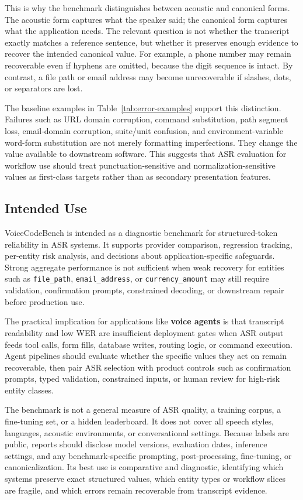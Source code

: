 \documentclass[10pt,twocolumn]{article}
\begin{document}
This is why the benchmark distinguishes between acoustic and canonical
forms. The acoustic form captures what the speaker said; the canonical
form captures what the application needs. The relevant question is not
whether the transcript exactly matches a reference sentence, but whether
it preserves enough evidence to recover the intended canonical value.
For example, a phone number may remain recoverable even if hyphens are
omitted, because the digit sequence is intact. By contrast, a file path
or email address may become unrecoverable if slashes, dots, or
separators are lost.

The baseline examples in Table~\ref{tab:error-examples} support this
distinction. Failures such as URL domain corruption, command
substitution, path segment loss, email-domain corruption, suite/unit
confusion, and environment-variable word-form substitution are not
merely formatting imperfections. They change the value available to
downstream software. This suggests that ASR evaluation for workflow use
should treat punctuation-sensitive and normalization-sensitive values as
first-class targets rather than as secondary presentation features.

\subsection{Intended Use}\label{intended-use}

VoiceCodeBench is intended as a diagnostic benchmark for
structured-token reliability in ASR systems. It supports provider
comparison, regression tracking, per-entity risk analysis, and decisions
about application-specific safeguards. Strong aggregate performance is
not sufficient when weak recovery for entities such as
\texttt{file\_path}, \texttt{email\_address}, or
\texttt{currency\_amount} may still require validation, confirmation
prompts, constrained decoding, or downstream repair before production
use.

The practical implication for applications like \textbf{voice agents} is that
transcript readability and low WER are insufficient deployment gates
when ASR output feeds tool calls, form fills, database writes, routing
logic, or command execution. Agent pipelines should evaluate whether the
specific values they act on remain recoverable, then pair ASR selection
with product controls such as confirmation prompts, typed validation,
constrained inputs, or human review for high-risk entity classes.

The benchmark is not a general measure of ASR quality, a training
corpus, a fine-tuning set, or a hidden leaderboard. It does not cover all
speech styles, languages, acoustic environments, or conversational
settings. Because labels are public, reports should disclose model
versions, evaluation dates, inference settings, and any
benchmark-specific prompting, post-processing, fine-tuning, or
canonicalization. Its best use is comparative and diagnostic, identifying
which systems preserve exact structured values, which entity types or
workflow slices are fragile, and which errors remain recoverable from
transcript evidence.
\end{document}
